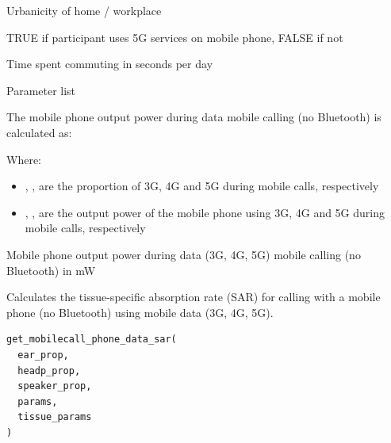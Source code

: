 \documentclass[a4paper]{book}
\begin{document}
%
\begin{Arguments}
\begin{ldescription}
\item[\code{urbanicity}] Urbanicity of home / workplace

\item[\code{use\_5g}] TRUE if participant uses 5G services on mobile phone, FALSE if not

\item[\code{travel\_time}] Time spent commuting in seconds per day

\item[\code{params}] Parameter list
\end{ldescription}
\end{Arguments}
%
\begin{Details}
The mobile phone output power during data mobile calling (no Bluetooth) is calculated as:

Where:
\begin{itemize}

\item{} , ,  are the proportion of 3G, 4G and 5G during mobile calls, respectively
\item{} , ,  are the output power of the mobile phone using 3G, 4G and 5G during mobile calls, respectively

\end{itemize}

\end{Details}
%
\begin{Value}
Mobile phone output power during data (3G, 4G, 5G) mobile calling (no Bluetooth) in mW
\end{Value}
%
\begin{Description}
Calculates the tissue-specific absorption rate (SAR) for calling with a mobile phone (no Bluetooth) using mobile data (3G, 4G, 5G).
\end{Description}
%
\begin{Usage}
\begin{verbatim}
get_mobilecall_phone_data_sar(
  ear_prop,
  headp_prop,
  speaker_prop,
  params,
  tissue_params
)
\end{verbatim}
\end{Usage}
\end{document}
